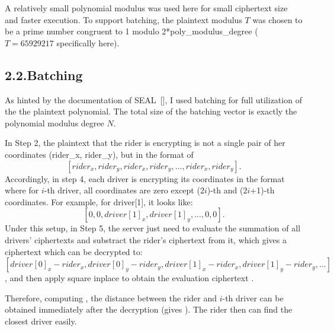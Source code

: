 \documentclass[12pt]{article}
\begin{document}
\noindent{}A relatively small polynomial modulus was used here for small ciphertext size and faster execution. To support batching, the plaintext modulus $T$ was chosen to be a prime number congruent to 1 modulo 2*poly\_modulus\_degree ($T = 65929217$ specifically here).%

\subsection{2.2.\hspace*{0.5em}Batching}\label{sec-batching}%

\noindent{}As hinted by the documentation of SEAL~[], I used batching for full utilization of the the plaintext polynomial.  The total size of the batching vector is exactly the polynomial modulus degree $N$.%

In Step 2, the plaintext that the rider is encrypting is not a single pair of her coordinates (rider\_x, rider\_y), but in the format of%
\noindent\noindent\[%
[rider_x, rider_y, rider_x, rider_y, ... ,rider_x, rider_y].
\]%
\noindent{}Accordingly, in step 4, each driver is encrypting its coordinates in the format where for $i$-th driver, all coordinates are zero except ($2i$)-th and ($2i$+1)-th coordinates. For example, for driver[1], it looks like:
\noindent\noindent\[%
[0, 0, driver[1]_x, driver[1]_y, ... , 0, 0].
\]%
\noindent{}Under this setup, in Step 5, the server just need to evaluate the summation of all drivers' ciphertexts and substract the rider's ciphertext from it, which gives a ciphertext which can be decrypted to:
\noindent\noindent\[%
[driver[0]_x - rider_x, driver[0]_y - rider_y, driver[1]_x - rider_x, driver[1]_y - rider_y, ... ]
\]%
\noindent{}, and then apply square inplace to obtain the evaluation ciphertext .

Therefore, computing , the distance between the rider and $i$-th driver can be obtained  immediately after the decryption (gives ). The rider then can find the closest driver easily.%
\end{document}
